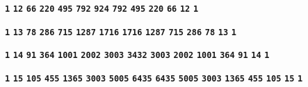 \documentclass{article}
\begin{document}
\hfil
\begin{minipage}{16.250000cm}
\textbf{\texttt{\Large 1}} \hfil \textbf{\texttt{\Large 12}} \hfil \textbf{\texttt{\Large 66}} \hfil \textbf{\texttt{\Large 220}} \hfil \textbf{\texttt{\Large 495}} \hfil \textbf{\texttt{\Large 792}} \hfil \textbf{\texttt{\Large 924}} \hfil \textbf{\texttt{\Large 792}} \hfil \textbf{\texttt{\Large 495}} \hfil \textbf{\texttt{\Large 220}} \hfil \textbf{\texttt{\Large 66}} \hfil \textbf{\texttt{\Large 12}} \hfil \textbf{\texttt{\Large 1}}
\end{minipage} 
\hfil
\par
\vfil



\hfil
\begin{minipage}{17.500000cm}
\textbf{\texttt{\Large 1}} \hfil \textbf{\texttt{\Large 13}} \hfil \textbf{\texttt{\Large 78}} \hfil \textbf{\texttt{\Large 286}} \hfil \textbf{\texttt{\Large 715}} \hfil \textbf{\texttt{\Large 1287}} \hfil \textbf{\texttt{\Large 1716}} \hfil \textbf{\texttt{\Large 1716}} \hfil \textbf{\texttt{\Large 1287}} \hfil \textbf{\texttt{\Large 715}} \hfil \textbf{\texttt{\Large 286}} \hfil \textbf{\texttt{\Large 78}} \hfil \textbf{\texttt{\Large 13}} \hfil \textbf{\texttt{\Large 1}}
\end{minipage} 
\hfil
\par
\vfil



\hfil
\begin{minipage}{18.750000cm}
\textbf{\texttt{\Large 1}} \hfil \textbf{\texttt{\Large 14}} \hfil \textbf{\texttt{\Large 91}} \hfil \textbf{\texttt{\Large 364}} \hfil \textbf{\texttt{\Large 1001}} \hfil \textbf{\texttt{\Large 2002}} \hfil \textbf{\texttt{\Large 3003}} \hfil \textbf{\texttt{\Large 3432}} \hfil \textbf{\texttt{\Large 3003}} \hfil \textbf{\texttt{\Large 2002}} \hfil \textbf{\texttt{\Large 1001}} \hfil \textbf{\texttt{\Large 364}} \hfil \textbf{\texttt{\Large 91}} \hfil \textbf{\texttt{\Large 14}} \hfil \textbf{\texttt{\Large 1}}
\end{minipage} 
\hfil
\par
\vfil



\hfil
\begin{minipage}{20.000000cm}
\textbf{\texttt{\Large 1}} \hfil \textbf{\texttt{\Large 15}} \hfil \textbf{\texttt{\Large 105}} \hfil \textbf{\texttt{\Large 455}} \hfil \textbf{\texttt{\Large 1365}} \hfil \textbf{\texttt{\Large 3003}} \hfil \textbf{\texttt{\Large 5005}} \hfil \textbf{\texttt{\Large 6435}} \hfil \textbf{\texttt{\Large 6435}} \hfil \textbf{\texttt{\Large 5005}} \hfil \textbf{\texttt{\Large 3003}} \hfil \textbf{\texttt{\Large 1365}} \hfil \textbf{\texttt{\Large 455}} \hfil \textbf{\texttt{\Large 105}} \hfil \textbf{\texttt{\Large 15}} \hfil \textbf{\texttt{\Large 1}}
\end{minipage} 
\hfil
\par
\vfil
\end{document}
